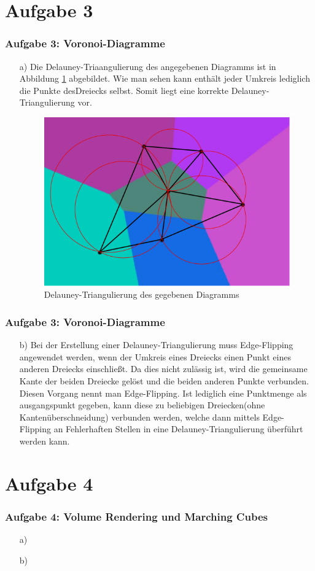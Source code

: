 \documentclass[accentcolor=tud9c,colorbacktitle,inverttitle,landscape,german,presentation,t]{tudbeamer}
\begin{document}
\section{Aufgabe 3}
\begin{frame}
	\frametitle{Aufgabe 3: Voronoi-Diagramme}
	\begin{itemize}
	\item[a)] Die Delauney-Triaangulierung des angegebenen Diagramms ist in Abbildung \ref{DelTri} abgebildet. Wie man sehen kann enthält jeder Umkreis lediglich die Punkte desDreiecks selbst. Somit liegt eine korrekte Delauney-Triangulierung vor.
	\begin{figure}
		\includegraphics[width = .5\linewidth]{task_3a.png}
		\caption{Delauney-Triangulierung des gegebenen Diagramms}
		\label{DelTri}
	\end{figure}
	\end{itemize} 
\end{frame}
\begin{frame}
	\frametitle{Aufgabe 3: Voronoi-Diagramme}
	\begin{itemize}
	\item[b)] Bei der Erstellung einer Delauney-Triangulierung muss Edge-Flipping angewendet werden, wenn der Umkreis eines Dreiecks einen Punkt eines anderen Dreiecks einschließt. Da dies nicht zulässig ist, wird die gemeinsame Kante der beiden Dreiecke gelöst und die beiden anderen Punkte verbunden. Diesen Vorgang nennt man Edge-Flipping. Ist lediglich eine Punktmenge als ausgangspunkt gegeben, kann diese zu beliebigen Dreiecken(ohne Kantenüberschneidung)  verbunden werden, welche dann mittels Edge-Flipping an Fehlerhaften Stellen in eine Delauney-Triangulierung überführt werden kann. 
	\end{itemize} 
\end{frame}

\section{Aufgabe 4}
\begin{frame}
	\frametitle{Aufgabe 4: Volume Rendering und Marching Cubes}
	\begin{itemize}
	\item[a)] %
	\item[b)] %
	\end{itemize}
\end{frame}
\end{document}
